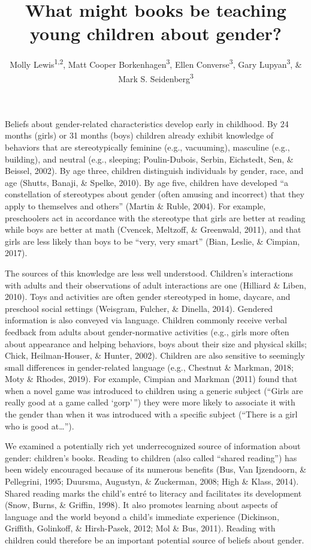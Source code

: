 \documentclass[
  english,
  ,man,floatsintext]{apa6}
\title{What might books be teaching young children about gender?}
\author{Molly Lewis\textsuperscript{1,2}, Matt Cooper Borkenhagen\textsuperscript{3}, Ellen Converse\textsuperscript{3}, Gary Lupyan\textsuperscript{3}, \& Mark S. Seidenberg\textsuperscript{3}}
\date{}
\affiliation{\vspace{0.5cm}\textsuperscript{1} Department of Psychology, Carnegie Mellon University\\\textsuperscript{2} Department of Social and Decision Sciences, Carnegie Mellon University\\\textsuperscript{3} Department of Psychology, University of Wisconsin-Madison}
\begin{document}
\maketitle

Beliefs about gender-related characteristics develop early in childhood. By 24 months (girls) or 31 months (boys) children already exhibit knowledge of behaviors that are stereotypically feminine (e.g., vacuuming), masculine (e.g., building), and neutral (e.g., sleeping; Poulin-Dubois, Serbin, Eichstedt, Sen, \& Beissel, 2002). By age three, children distinguish individuals by gender, race, and age (Shutts, Banaji, \& Spelke, 2010). By age five, children have developed ``a constellation of stereotypes about gender (often amusing and incorrect) that they apply to themselves and others'' (Martin \& Ruble, 2004). For example, preschoolers act in accordance with the stereotype that girls are better at reading while boys are better at math (Cvencek, Meltzoff, \& Greenwald, 2011), and that girls are less likely than boys to be ``very, very smart'' (Bian, Leslie, \& Cimpian, 2017).

The sources of this knowledge are less well understood. Children's interactions with adults and their observations of adult interactions are one (Hilliard \& Liben, 2010). Toys and activities are often gender stereotyped in home, daycare, and preschool social settings (Weisgram, Fulcher, \& Dinella, 2014). Gendered information is also conveyed via language. Children commonly receive verbal feedback from adults about gender-normative activities (e.g., girls more often about appearance and helping behaviors, boys about their size and physical skills; Chick, Heilman-Houser, \& Hunter, 2002). Children are also sensitive to seemingly small differences in gender-related language (e.g., Chestnut \& Markman, 2018; Moty \& Rhodes, 2019). For example, Cimpian and Markman (2011) found that when a novel game was introduced to children using a generic subject (``Girls are really good at a game called `gorp'\,'') they were more likely to associate it with the gender than when it was introduced with a specific subject (``There is a girl who is good at\ldots{}'').

We examined a potentially rich yet underrecognized source of information about gender: children's books. Reading to children (also called ``shared reading'') has been widely encouraged because of its numerous benefits (Bus, Van Ijzendoorn, \& Pellegrini, 1995; Duursma, Augustyn, \& Zuckerman, 2008; High \& Klass, 2014). Shared reading marks the child's entré to literacy and facilitates its development (Snow, Burns, \& Griffin, 1998). It also promotes learning about aspects of language and the world beyond a child's immediate experience (Dickinson, Griffith, Golinkoff, \& Hirsh-Pasek, 2012; Mol \& Bus, 2011). Reading with children could therefore be an important potential source of beliefs about gender.
\end{document}
